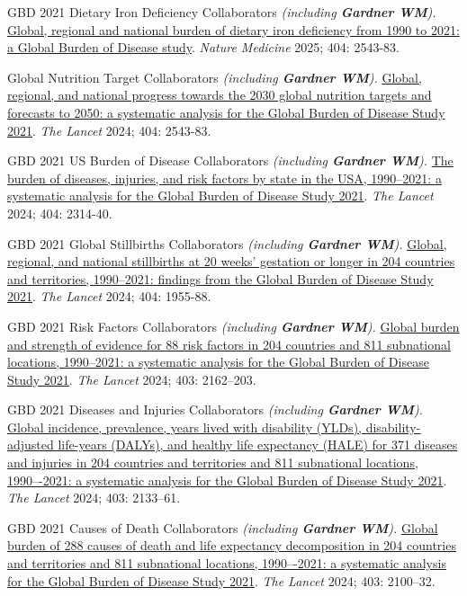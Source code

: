 \documentclass[11pt,article,oneside]{memoir}
\begin{document}
\ind GBD 2021 Dietary Iron Deficiency Collaborators \emph{(including \textbf{Gardner WM}).} \href{https://doi.org/10.1038/s41591-025-03624-8}{Global, regional and national burden of dietary iron deficiency from 1990 to 2021: a Global Burden of 
Disease study}. \emph{Nature Medicine} 2025; 404: 2543-83. 

\ind Global Nutrition Target Collaborators \emph{(including \textbf{Gardner WM}).} \href{https://doi.org/10.1016/S0140-6736(24)01821-X}{Global, regional, and national progress towards the 2030 global nutrition targets and forecasts to 2050: a systematic 
analysis for the Global Burden of Disease Study 2021}. \emph{The Lancet} 2024; 404: 2543-83. 

\ind GBD 2021 US Burden of Disease Collaborators \emph{(including \textbf{Gardner WM}).} \href{https://doi.org/10.1016/S0140-6736(24)01446-6}{The burden of diseases, injuries, and risk factors by state in the USA, 1990–2021: a systematic analysis for 
the Global Burden of Disease Study 2021}. \emph{The Lancet} 2024; 404: 2314-40. 

\ind GBD 2021 Global Stillbirths Collaborators \emph{(including \textbf{Gardner WM}).} \href{https://doi.org/10.1016/S0140-6736(24)01925-1}{Global, regional, and national stillbirths at 20 weeks' gestation or longer in 204 countries and territories, 
1990–2021: findings from the Global Burden of Disease Study 2021}. \emph{The Lancet} 2024; 404: 1955-88. 

\ind GBD 2021 Risk Factors Collaborators \emph{(including \textbf{Gardner WM}).} \href{https://doi.org/10.1016/S0140-6736(24)00933-4}{Global burden and strength of evidence for 88 risk factors in 204 countries and 811 subnational locations, 
1990–2021: a systematic analysis for the Global Burden of Disease Study 2021}. \emph{The Lancet} 2024; 403: 2162--203.

\ind GBD 2021 Diseases and Injuries Collaborators \emph{(including \textbf{Gardner WM}).} \href{https://doi.org/10.1016/S0140-6736(24)00757-8}{Global incidence, prevalence, years lived with disability (YLDs), disability-adjusted life-years (DALYs), 
and healthy life expectancy (HALE) for 371 diseases and injuries in 204 countries and territories and 811 subnational locations, 1990–-2021: a systematic analysis for the Global Burden of Disease Study 2021}. \emph{The Lancet} 2024; 403: 2133--61.

\ind GBD 2021 Causes of Death Collaborators \emph{(including \textbf{Gardner WM}).} \href{https://doi.org/10.1016/S0140-6736(24)00367-2}{Global burden of 288 causes of death and life expectancy decomposition in 204 countries and 
territories and 811 subnational locations, 1990–-2021: a systematic analysis for the Global Burden of Disease Study 2021}. \emph{The Lancet} 2024; 403: 2100--32.
\end{document}
